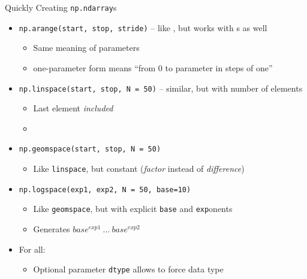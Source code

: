 \begin{frame}[fragile]{Quickly Creating \texttt{np.ndarray}s}
%
\begin{itemize}
\item \texttt{np.arange(start, stop, stride)} -- like , but works with s as well
	\begin{itemize}
	\item Same meaning of parameters
	\item one-parameter form means \enquote{from 0 to parameter in steps of one}
	\end{itemize}
\item \texttt{np.linspace(start, stop, N = 50)} -- similar, but with number of elements
	\begin{itemize}
	\item Last element \emph{included}
	\item {}
	\end{itemize}
\item \texttt{np.geomspace(start, stop, N = 50)}
	\begin{itemize}
	\item Like \texttt{linspace}, but constant (\emph{factor} instead of \emph{difference})
	\end{itemize}
\item \texttt{np.logspace(exp1, exp2, N = 50, base=10)}
	\begin{itemize}
	\item Like \texttt{geomspace}, but with explicit \texttt{base} and \texttt{exp}onents
	\item Generates $base^{exp1} ~...~ base^{exp2}$
	\end{itemize}
\item For all:
	\begin{itemize}
	\item Optional parameter \texttt{dtype} allows to force data type
	\end{itemize}
\end{itemize}
%
\end{frame}


